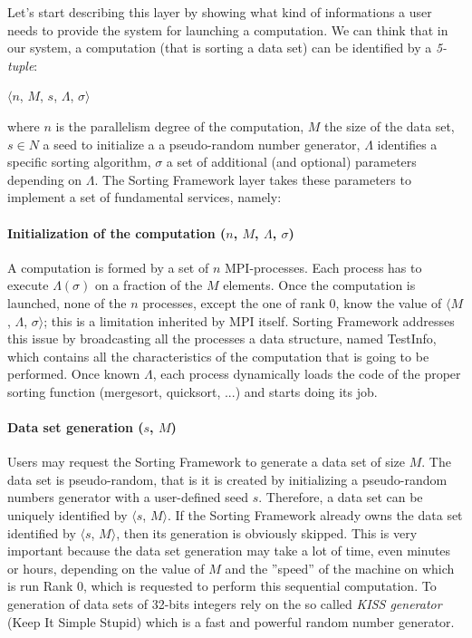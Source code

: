 \label{sort-fram}
Let's start describing this layer by showing what kind of informations a user needs to provide the system for launching a computation. We can think that in our system, a computation (that is sorting a data set) can be identified by a \textit{5-tuple}:
\begin{center}
$\langle n$, $M$, $s$, $\Lambda$, $\sigma \rangle$
\end{center} 
where $n$ is the parallelism degree of the computation, $M$ the size of the data set, $s \in N$ a seed to initialize a a pseudo-random number generator, $\Lambda$ identifies a specific sorting algorithm, $\sigma$ a set of additional (and optional) parameters depending on $\Lambda$.
The Sorting Framework layer takes these parameters to implement a set of fundamental services, namely: 

\paragraph{Initialization of the computation ($n$, $M$, $\Lambda$, $\sigma$)} A computation is formed by a set of $n$ MPI-processes. Each process has to execute $\Lambda(\sigma)$ on a fraction of the $M$ elements. Once the computation is launched, none of the $n$ processes, except the one of rank $0$, know the value of $\langle M$, $\Lambda$, $\sigma \rangle$; this is a limitation inherited by MPI itself. Sorting Framework addresses this issue by broadcasting all the processes a data structure, named TestInfo, which contains all the characteristics of the computation that is going to be performed. Once known $\Lambda$, each process dynamically loads the code of the proper sorting function (mergesort, quicksort, ...) and starts doing its job.  

\paragraph{Data set generation ($s$, $M$)} Users may request the Sorting Framework to generate a data set of size $M$. The data set is pseudo-random, that is it is created by initializing a pseudo-random numbers generator with a user-defined seed $s$. Therefore, a data set can be uniquely identified by $\langle s$, $M \rangle$. If the Sorting Framework already owns the data set identified by $\langle s$, $M \rangle$, then its generation is obviously skipped. This is very important because the data set generation may take a lot of time, even minutes or hours, depending on the value of $M$ and the ''speed'' of the machine on which is run Rank $0$, which is requested to perform this sequential computation. To generation of data sets of 32-bits integers rely on the so called \textit{KISS generator} (Keep It Simple Stupid) which is a fast and powerful random number generator.

